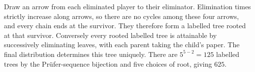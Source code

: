 Draw an arrow from each eliminated player to their eliminator. Elimination times strictly increase along arrows, so there are no cycles among these four arrows, and every chain ends at the survivor. They therefore form a labelled tree rooted at that survivor. Conversely every rooted labelled tree is attainable by successively eliminating leaves, with each parent taking the child's paper. The final distribution determines this tree uniquely. There are $5^{5-2}=125$ labelled trees by the Pr\"ufer-sequence bijection and five choices of root, giving $\boxed{625}$.
